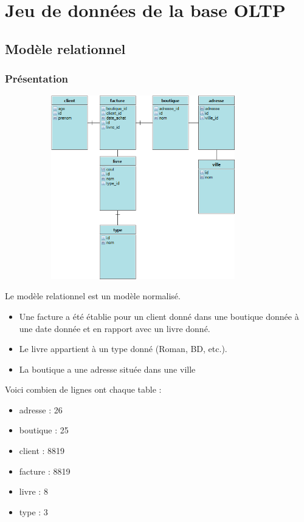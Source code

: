
\chapter{Jeu de données de la base OLTP}
\section{Modèle relationnel}
\subsection{Présentation}

\includegraphics[clip=true, width=120mm, height=80mm]{./images/library.png}

Le modèle relationnel est un modèle normalisé. 
\begin{itemize}
\item Une facture a été établie pour un client donné dans une boutique donnée à une date donnée et en rapport avec un livre donné. 
\item Le livre appartient à un type donné (Roman, BD, etc.). 
\item La boutique a une adresse située dans une ville
\end{itemize}


Voici combien de lignes ont chaque table :
\begin{itemize}
\item adresse : 26
\item boutique : 25
\item client : 8819
\item facture : 8819
\item livre : 8
\item type : 3
\end{itemize}


